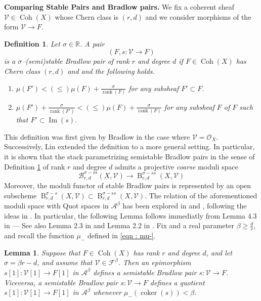 \documentclass[11pt]{article}
\newtheorem{definition}{Definition}
\newtheorem{lemma}[theorem]{Lemma}
\newcommand{\BR}{\mathbb{R}}
\newcommand{\fbeta}{\mathcal{F}^{\beta}}
\newcommand{\abeta}{\mathcal{A}^{\beta}}
\newcommand{\coh}{\operatorname{Coh}}
\newcommand{\framing}{\mathcal{V}}
\newcommand{\bradstack}{\mathcal{B}^{\sigma - ss}_{r,d}(X,\mathcal{V})}
\newcommand{\brad}{\operatorname{{B}}^{\sigma - ss}_{r,d}(X,\mathcal{V})}
\begin{document}
\noindent\textbf{Comparing Stable Pairs and Bradlow pairs. }We fix a coherent sheaf $\framing \in \coh(X)$ whose Chern class is $(r,d)$ and we consider morphisms of the form $\framing\rightarrow F$.

\begin{definition}\label{def : bradlow pair}
    Let $\sigma \in \BR$. A pair
    \[
        (F, s\colon \framing \rightarrow F)
    \]
    is a $\sigma$--(semi)stable Bradlow pair of rank $r$ and degree $d$ if $F \in \coh(X)$ has Chern class $(r,d)$ and and the following holds.
    \begin{enumerate}
        \item $\mu(F') < (\leq) \mu(F)+ \frac{\sigma}{\operatorname{rank}(F)}$ for any subsheaf $F'\subset F$.
        \item $\mu(F') + \frac{\sigma}{\operatorname{rank}(F')}< (\leq) \mu(F) + \frac{\sigma}{\operatorname{rank}(F)}$ for any subsheaf $F$ of $F$ such that $F'\subset \operatorname{Im}(s)$.
    \end{enumerate}
\end{definition}

\noindent This definition was first given by Bradlow \cite{bradlow1993birationalequivalencesvortexmoduli} in the case where $\framing = \mathcal{O}_X$. Successively, Lin \cite{Lin_2018} extended the definition to a more general setting. In particular, it is shown that the stack parametrizing semistable Bradlow pairs in the sense of Definition \ref{def : bradlow pair} of rank $r$ and degree $d$ admits a projective \textit{coarse} moduli space 
\begin{equation}\label{eqn : coarse bradlow}
   \bradstack \longrightarrow \brad
\end{equation}
Moreover, the moduli functor of stable Bradlow pairs is represented by an open subscheme $\operatorname{B}^{\sigma -s}_{r,d}(X,\framing) \subset \brad$. The relation of the aforementioned moduli space with Quot spaces in $\abeta$ has been explored in \cite{10.4134/JKMS.J230331} and \cite{Rota_2021}, following the ideas  in \cite{bridgeland2020hallalgebrascurvecountinginvariants}. In particular, the following Lemma follows immediatly from Lemma 4.3 in \cite{Rota_2021} --- See also Lemma 2.3 in \cite{bridgeland2020hallalgebrascurvecountinginvariants} and Lemma 2.2 in \cite{10.4134/JKMS.J230331}. Fix and a real parameter $\beta \geq \frac{d}{r}$, and recall the function $\mu_-$ defined in \eqref{eqn : mu-}. 

\begin{lemma}\label{lem : bradlow vs quot}
    Suppose that $F \in \coh(X)$ has rank $r$ and degree $d$, and let $\sigma = \beta r - d$, and assume that $\framing \in \fbeta$. Then an epimorphism $s[1] \colon \framing[1] \rightarrow F[1]$ in $\abeta$ defines a semistable Bradlow pair $s \colon \framing \rightarrow F$. Viceversa, a semistable Bradlow pair $s \colon \framing \rightarrow F$ defines a quotient $s[1] \colon \framing[1] \rightarrow F[1]$ in $\abeta$ whenever $\mu_-(\operatorname{coker}(s)) < \beta$. 
\end{lemma}
\end{document}

